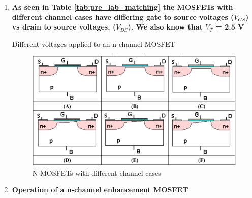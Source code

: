 \begin{enumerate}
    \item \textbf{As seen in Table \ref{tab:pre_lab_matching} the MOSFETs with different channel cases have differing gate to source voltages ($V_{GS}$) vs drain to source voltages. ($V_{DS}$). We also know that $V_T$ = 2.5 V}

\begin{table}[h]
    
    \caption{Different voltages applied to an n-channel MOSFET}
    \label{tab:pre_lab_matching}
\end{table}

\begin{figure}[h]
    \centering
    \includegraphics[width=.75\linewidth]{figures/prelab_MOSFETS.png}
    \caption{N-MOSFETs with different channel cases}
    \label{fig:prelab_MOSFETS}
\end{figure}

\clearpage

    \item \textbf{Operation of a n-channel enhancement MOSFET}


\end{enumerate}
